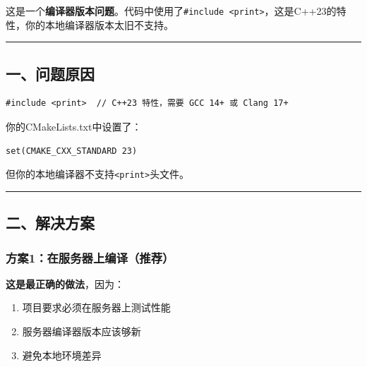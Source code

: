 \documentclass[11pt, a4paper]{article}
\begin{document}
\begin{aibox}
这是一个\textbf{编译器版本问题}。代码中使用了\texttt{\#include \textless print\textgreater}，这是C++23的特性，你的本地编译器版本太旧不支持。

\begin{center}\rule{\textwidth}{0.4pt}\end{center}

\subsection*{一、问题原因}

\begin{tcolorbox}[colback=white,colframe=gray!50!white,boxrule=0.5pt,arc=2pt,left=5pt,right=5pt,top=5pt,bottom=5pt]
\begin{verbatim}
#include <print>  // C++23 特性，需要 GCC 14+ 或 Clang 17+
\end{verbatim}
\end{tcolorbox}

你的CMakeLists.txt中设置了：
\begin{tcolorbox}[colback=white,colframe=gray!50!white,boxrule=0.5pt,arc=2pt,left=5pt,right=5pt,top=5pt,bottom=5pt]
\begin{verbatim}
set(CMAKE_CXX_STANDARD 23)
\end{verbatim}
\end{tcolorbox}

但你的本地编译器不支持\texttt{\textless print\textgreater}头文件。

\begin{center}\rule{\textwidth}{0.4pt}\end{center}

\subsection*{二、解决方案}

\subsubsection*{方案1：在服务器上编译（推荐）}

\textbf{这是最正确的做法}，因为：
\begin{enumerate}
    \item 项目要求必须在服务器上测试性能
    \item 服务器编译器版本应该够新
    \item 避免本地环境差异
\end{enumerate}


\end{aibox}
\end{document}
